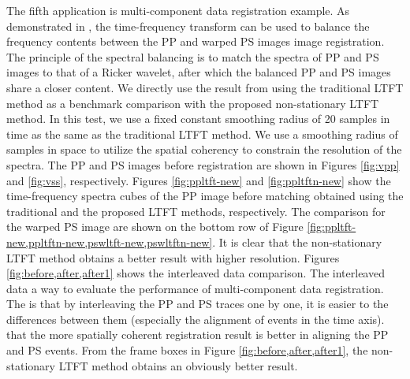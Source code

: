 The fifth application is  multi-component data registration example. As demonstrated in \cite{fomel20052}, the time-frequency transform can be used to balance the frequency contents between the PP and warped PS images  image registration.  The principle of the spectral balancing is to match the spectra of PP and PS images to that of a Ricker wavelet, after which the balanced PP and PS images share a closer  content. We directly use the result from \cite{liuyang2012} using the traditional LTFT method as a benchmark comparison with the proposed non-stationary LTFT method. In this test, we use a fixed constant smoothing radius of 20 samples in time as the same as the traditional LTFT method. We use a smoothing radius of  samples in space to utilize the spatial coherency to constrain the resolution of the spectra. The PP and PS images before registration are shown in Figures \ref{fig:vpp} and \ref{fig:vss}, respectively. Figures \ref{fig:ppltft-new} and \ref{fig:ppltftn-new} show the time-frequency spectra cubes of the PP image before matching obtained using the traditional and the proposed LTFT methods, respectively. The comparison for the warped PS image are shown on the bottom row of Figure \ref{fig:ppltft-new,ppltftn-new,pswltft-new,pswltftn-new}. It is clear that the non-stationary LTFT method obtains a better result with higher resolution. Figures \ref{fig:before,after,after1} shows the interleaved data comparison. The interleaved data  a way to evaluate the performance of multi-component data registration. The  is that by interleaving the PP and PS traces one by one, it is easier to  the differences between them (especially the alignment of events in the time axis).  that the more spatially coherent registration result is better in aligning the PP and PS events. From the frame boxes in Figure \ref{fig:before,after,after1}, the non-stationary LTFT method obtains an obviously better result. 


